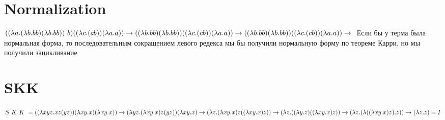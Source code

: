 \documentclass{article}
\begin{document}
\section{Normalization}
$((\lambda a.(\lambda b.bb)(\lambda b.bb))\ b)((\lambda c.(c b))(\lambda a.a)) \to \\ 
((\lambda b.bb)(\lambda b.bb)) ((\lambda c.(cb))(\lambda a.a)) \to \\
((\lambda b.bb)(\lambda b.bb)) ((\lambda c.(cb))(\lambda a.a)) \to \\$
Если бы у терма была нормальная форма, то последовательным сокращением левого редекса мы бы получили нормальную форму по теореме Карри, но мы получили зацикливание
\section{SKK}
$
S \ K \ K \ = \\
((\lambda xyz.xz(yz))(\lambda xy.x)(\lambda xy.x)) \to \\
(\lambda yz.(\lambda xy.x)z(yz))(\lambda xy.x) \to \\
(\lambda z.(\lambda xy.x)z((\lambda xy.x)z)) \to \\
(\lambda z.((\lambda y.z)((\lambda xy.x)z)) \to \\
(\lambda z.(\lambda ((\lambda xy.x)z).z)) \to \\
(\lambda z.z) = I
$
\end{document}
